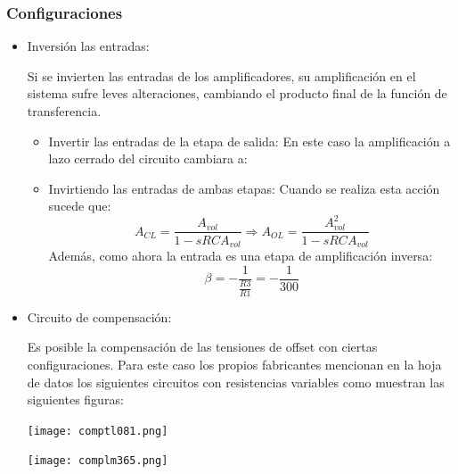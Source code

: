 \subsubsection{Configuraciones}

\begin{itemize}
    \item Inversión las entradas:
    
    Si se invierten las entradas de los amplificadores, su amplificación en el sistema sufre leves alteraciones, cambiando el producto final de la función de transferencia. 
    
    \begin{itemize}
        \item Invertir las entradas de la etapa de salida: En este caso la amplificación a lazo cerrado del circuito cambiara a:
        \item Invirtiendo las entradas de ambas etapas: Cuando se realiza esta acción sucede que:
        $$A_{CL} = \frac{A_{vol}}{1 - sRCA_{vol}} \Longrightarrow A_{OL} = \frac{A_{vol}^2}{1 - sRCA_{vol}}$$
        Además, como ahora la entrada es una etapa de amplificación inversa:
        $$\beta = -\frac{1}{\frac{R3}{R1}} = -\frac{1}{300}$$
    \end{itemize}
    
    \item Circuito de compensación:
    
    Es posible la compensación de las tensiones de offset con ciertas configuraciones. Para este caso los propios fabricantes mencionan en la hoja de datos los siguientes circuitos con resistencias variables como muestran las siguientes figuras:
    
    \begin{minipage}{.4\textwidth}
    \begin{center}
        \texttt{[image: comptl081.png]}
        \captionsetup{justification=centering}
        \label{ej2comp081} 
    \end{center}
    \end{minipage}
    \hspace{0.5cm}
    \begin{minipage}{.4\textwidth}
    \begin{center}
        \texttt{[image: complm365.png]}
        \captionsetup{justification=centering}
        \label{ej2comp365} 
    \end{center}
    \end{minipage}
    

\end{itemize}
